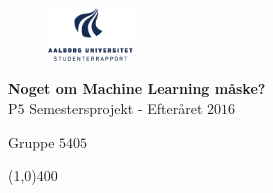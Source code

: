 \clearpage
\thispagestyle{empty}

\begin{figure}[H]
	\raggedleft
		\includegraphics[width=0.2\textwidth]{figures/aaulogo-da.png}
\end{figure} 
\vspace*{\fill} 
\begin{center}	
\begin{Huge}
\textbf{Noget om Machine Learning måske?}\\
\vspace{5 mm}
P$5$ Semestersprojekt - Efteråret $2016$\\
\vspace{3 mm}
\end{Huge}
{\Large Gruppe $5405$}
\end{center}
\vspace*{\fill}

\begin{center}
\line(1,0){400}
\end{center}
